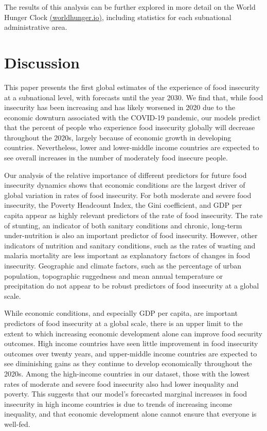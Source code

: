\documentclass[titlepage]{article}
\begin{document}
The results of this analysis can be further explored in more detail on the World Hunger Clock \href{https://worldhunger.io}{(worldhunger.io)}, including statistics for each subnational administrative area.

\section{Discussion}
This paper presents the first global estimates of the experience of food insecurity at a subnational level, with forecasts until the year 2030.  We find that, while food insecurity has been increasing and has likely worsened in 2020 due to the economic downturn associated with the COVID-19 pandemic, our models predict that the percent of people who experience food insecurity globally will decrease throughout the 2020s, largely because of economic growth in developing countries.  Nevertheless, lower and lower-middle income countries are expected to see overall increases in the number of moderately food insecure people. 

Our analysis of the relative importance of different predictors for future food insecurity dynamics shows that economic conditions are the largest driver of global variation in rates of food insecurity. For both moderate and severe food insecurity, the Poverty Headcount Index, the Gini coefficient, and GDP per capita appear as highly relevant predictors of the rate of food insecurity. The rate of stunting, an indicator of both sanitary conditions and chronic, long-term under-nutrition is also an important predictor of food insecurity. However, other indicators of nutrition and sanitary conditions, such as the rates of wasting and malaria mortality are less important as explanatory factors of changes in food insecurity. Geographic and climate factors, such as the percentage of urban population, topographic ruggedness and mean annual temperature or precipitation do not appear to be robust predictors of food insecurity at a global scale. 

While economic conditions, and especially GDP per capita, are important predictors of food insecurity at a global scale, there is an upper limit to the extent to which increasing economic development alone can improve food security outcomes.  High income countries have seen little improvement in food insecurity outcomes over twenty years, and upper-middle income countries are expected to see diminishing gains as they continue to develop economically throughout the 2020s.  Among the high-income countries in our dataset, those with the lowest rates of moderate and severe food insecurity also had lower inequality and poverty.  This suggests that our model's forecasted marginal increases in food insecurity in high income countries is due to trends of increasing income inequality, and that economic development alone cannot ensure that everyone is well-fed.
\end{document}
